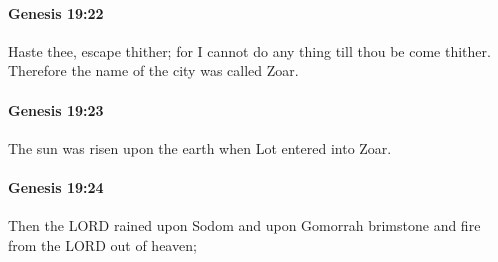 		\paragraph{Genesis 19:22} %
			\label{GENESIS-19-22}

			Haste thee, escape thither; for I cannot do any thing till thou be come thither.  Therefore the name of the city was called Zoar.


		\paragraph{Genesis 19:23} %
			\label{GENESIS-19-23}

			The sun was risen upon the earth when Lot entered into Zoar.


		\paragraph{Genesis 19:24} %
			\label{GENESIS-19-24}

			Then the LORD rained upon Sodom and upon Gomorrah brimstone and fire from the LORD out of heaven;


